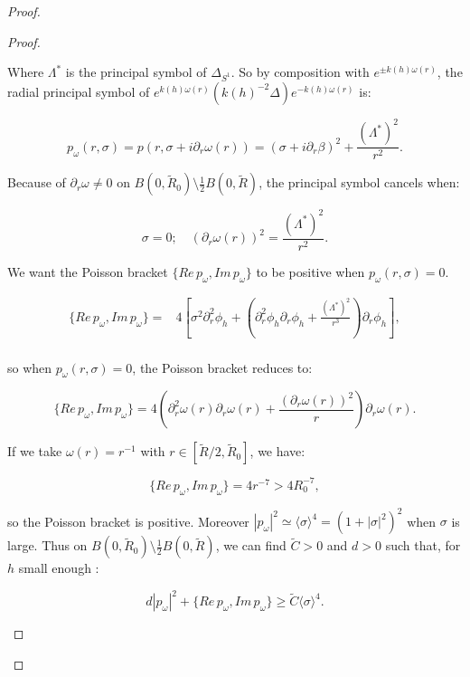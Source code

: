\documentclass[leqno,11pt,letterpaper, english]{amsart}
\newcommand{\nn}{\nonumber}
\theoremstyle{plain}
\theoremstyle{definition}
\numberwithin{equation}{section}
\begin{document}
\begin{proof}
\begin{proof}
\begin{itemize}
				Where $\Lambda^*$ is the principal symbol of $\Delta_{S^{1}}$.
				So by composition with $e^{\pm k(h)\omega(r)}$, the radial principal symbol of $e^{k(h)\omega(r)}(k(h)^{-2}\Delta)e^{-k(h)\omega(r)}$ is:
				
				\begin{equation}
					p_{\omega}(r,\sigma)=p(r,\sigma +i\partial_r \omega(r))= (\sigma+i\partial_r\beta)^2+\frac{(\Lambda^*)^2}{r^2}.
				\end{equation}
			
				Because of $\partial_r\omega\neq 0$ on $B(0,\tilde{R}_0)\setminus \frac{1}{2}B(0,\tilde{R})$, the principal symbol cancels when: 
				
					$$\sigma=0; \quad (\partial_r\omega(r))^2=\frac{(\Lambda^*)^2}{r^2}.$$
			
				We want the Poisson bracket $\{Re\, p_{\omega}, Im\, p_{\omega}\}$ to be positive when $p_{\omega}(r,\sigma)=0$.
				
				\begin{align}
					\{Re\, p_{\omega}, Im\, p_{\omega}\}=& 4\left[\sigma^2\partial_r^2\phi_h +\left(\partial_r^2 \phi_h \partial_r \phi_h +\frac{(\Lambda^*)^2}{r^3} \right)\partial_r \phi_h \right],\nn\\
				\end{align}
				
				so when $p_{\omega}(r,\sigma)=0$, the Poisson bracket reduces to:
				
				\begin{equation}
					\{Re\, p_{\omega}, Im\, p_{\omega}\}= 4\left(\partial_r^2 \omega(r) \partial_r \omega(r) +\frac{(\partial_r \omega(r))^2}{r} \right)\partial_r \omega(r). 
				\end{equation}
				
				If we take $\omega(r)= r^{-1}$ with $r\in [\tilde{R}/2,\tilde{R}_0]$, we have:
				
				\begin{equation}
					\{Re\, p_{\omega}, Im\, p_{\omega}\}=4 r^{-7}>4 R_0^{-7},
				\end{equation}
				
				so the Poisson bracket is positive.
				Moreover $|p_{\omega}|^2 \simeq \langle \sigma \rangle^4=(1+|\sigma|^2)^2$ when $\sigma$ is large. Thus on $B(0,\tilde{R}_0)\setminus \frac{1}{2}B(0,\tilde{R})$, we can find $\tilde{C}>0$ and $d>0$ such that, for $h$ small enough :
				
				\begin{equation}
					d|p_{\omega}|^2+ \{Re\, p_{\omega}, Im\, p_{\omega}\} \geq \tilde{C}\langle \sigma \rangle^4.
				\end{equation}
				

\end{itemize}
\end{proof}
\end{proof}
\end{document}

